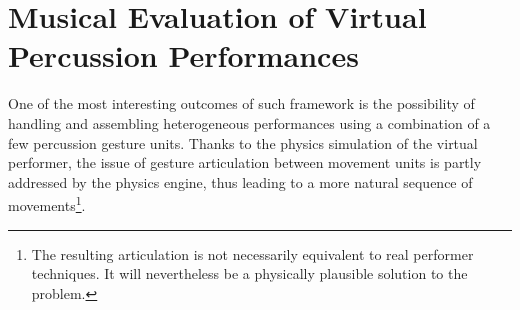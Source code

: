




	\section{Musical Evaluation of Virtual Percussion Performances}
	\label{sec:Music_Evaluation}

One of the most interesting outcomes of such framework is the possibility of handling and assembling heterogeneous performances using a combination of a few percussion gesture units. Thanks to the physics simulation of the virtual performer, the issue of gesture articulation between movement units is partly addressed by the physics engine, thus leading to a more natural sequence of movements\footnote{The resulting articulation is not necessarily equivalent to real performer techniques. It will nevertheless be a physically plausible solution to the problem.}.\\

